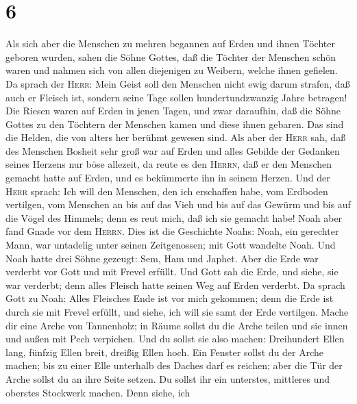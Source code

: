 \hypertarget{section-5}{%
\section{6}\label{section-5}}

 Als sich aber die Menschen zu mehren begannen auf Erden
und ihnen Töchter geboren wurden,  sahen die Söhne Gottes,
daß die Töchter der Menschen schön waren und nahmen sich von allen
diejenigen zu Weibern, welche ihnen gefielen.  Da sprach
der \textsc{Herr}: Mein Geist soll den Menschen nicht ewig darum
strafen, daß auch er Fleisch ist, sondern seine Tage sollen
hundertundzwanzig Jahre betragen!  Die Riesen waren auf
Erden in jenen Tagen, und zwar daraufhin, daß die Söhne Gottes zu den
Töchtern der Menschen kamen und diese ihnen gebaren. Das sind die
Helden, die von alters her berühmt gewesen sind.  Als aber
der \textsc{Herr} sah, daß des Menschen Bosheit sehr groß war auf Erden
und alles Gebilde der Gedanken seines Herzens nur böse allezeit,
 da reute es den \textsc{Herrn}, daß er den Menschen
gemacht hatte auf Erden, und es bekümmerte ihn in seinem Herzen.
 Und der \textsc{Herr} sprach: Ich will den Menschen, den
ich erschaffen habe, vom Erdboden vertilgen, vom Menschen an bis auf das
Vieh und bis auf das Gewürm und bis auf die Vögel des Himmels; denn es
reut mich, daß ich sie gemacht habe!  Noah aber fand Gnade
vor dem \textsc{Herrn}.  Dies ist die Geschichte Noahs:
Noah, ein gerechter Mann, war untadelig unter seinen Zeitgenossen; mit
Gott wandelte Noah.  Und Noah hatte drei Söhne gezeugt:
Sem, Ham und Japhet.  Aber die Erde war verderbt vor Gott
und mit Frevel erfüllt.  Und Gott sah die Erde, und
siehe, sie war verderbt; denn alles Fleisch hatte seinen Weg auf Erden
verderbt.  Da sprach Gott zu Noah: Alles Fleisches Ende
ist vor mich gekommen; denn die Erde ist durch sie mit Frevel erfüllt,
und siehe, ich will sie samt der Erde vertilgen.  Mache
dir eine Arche von Tannenholz; in Räume sollst du die Arche teilen und
sie innen und außen mit Pech verpichen.  Und du sollst
sie also machen: Dreihundert Ellen lang, fünfzig Ellen breit, dreißig
Ellen hoch.  Ein Fenster sollst du der Arche machen; bis
zu einer Elle unterhalb des Daches darf es reichen; aber die Tür der
Arche sollst du an ihre Seite setzen. Du sollst ihr ein unterstes,
mittleres und oberstes Stockwerk machen.  Denn siehe, ich

